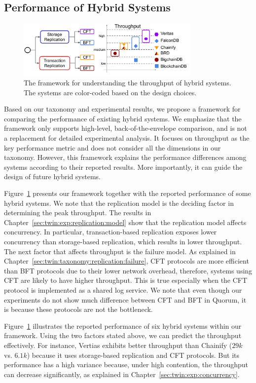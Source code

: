 \subsection{Performance of Hybrid Systems}
\label{sec:twin:exp:hybrids}
\begin{figure}
	\centering
	\includegraphics[width=0.8\textwidth]{diagram/twin/performance_framework.pdf}
	\caption{The framework for understanding the throughput of hybrid systems.
	The systems are color-coded based on the design choices.} 
	\label{diagram:twin:perf_framework}
\end{figure}

Based on our taxonomy and experimental results, we propose a framework for
comparing the performance of existing hybrid systems.
We emphasize that the framework only supports high-level, back-of-the-envelope
comparison, and is not a replacement for detailed experimental analysis.
It focuses on throughput as the key performance metric and does not consider all
the dimensions in our taxonomy.
However, this framework explains the performance differences among systems
according to their reported results.
More importantly, it can guide the design of future hybrid systems.

Figure~\ref{diagram:twin:perf_framework} presents our framework together with the
reported performance of some hybrid systems.
We note that the replication model is the deciding factor in determining the
peak throughput.
The results in Chapter~\ref{sec:twin:exp:replication:model} show that the replication
model affects concurrency.
In particular, transaction-based replication exposes lower concurrency than
storage-based replication, which results in lower throughput.
The next factor that affects throughput is the failure model.
As explained in Chapter~\ref{sec:twin:taxonomy:replication:failure}, CFT protocols
are more efficient than BFT protocols due to their lower network overhead,
therefore, systems using CFT are likely to have higher throughput.
This is true especially when the CFT protocol is implemented as a shared log
service.
We note that even though our experiments do not show much difference between CFT
and BFT in Quorum, it is because these protocols are not the bottleneck.

Figure~\ref{diagram:twin:perf_framework} illustrates the reported performance of six
hybrid systems within our framework.
Using the two factors stated above, we can predict the throughput effectively.
For instance, Vertias exhibits better throughput than Chainify ($29k$ vs.
$6.1k$) because it uses storage-based replication and CFT protocols.
But its performance has a high variance because, under high contention, the
throughput can decrease significantly, as explained in
Chapter~\ref{sec:twin:exp:concurrency}.